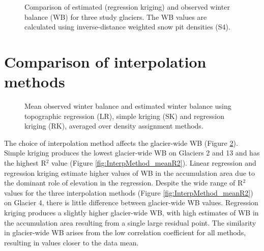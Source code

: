 \documentclass{sfuthesis}
\begin{document}
\begin{figure}
	\caption{Comparison of estimated (regression kriging) and observed winter balance (WB) for three study glaciers. The WB values are calculated using inverse-distance weighted snow pit densities (S4).}
	\label{fig:R2regressionkrig}
\end{figure}


\section{Comparison of interpolation methods}
\label{sec:compareInterpMethods}

\begin{figure}[b]
	\caption{Mean observed winter balance and estimated winter balance using topographic regression (LR), simple kriging (SK) and regression kriging (RK), averaged over density assignment methods.}
	\label{fig:InterpMethod_mean}
\end{figure}


The choice of interpolation method affects the glacier-wide WB (Figure \ref{fig:InterpMethod_mean}). Simple kriging produces the lowest glacier-wide WB on Glaciers 2 and 13 and has the highest R$^2$ value (Figure \ref{fig:InterpMethod_meanR2}). Linear regression and regression kriging estimate higher values of WB in the accumulation area due to the dominant role of elevation in the regression. Despite the wide range of R$^2$ values for the three interpolation methods (Figure \ref{fig:InterpMethod_meanR2}) on Glacier 4, there is little difference between glacier-wide WB values. Regression kriging produces a slightly higher glacier-wide WB, with high estimates of WB in the accumulation area resulting from a single large residual point. The similarity in glacier-wide WB arises from the low correlation coefficient for all methods, resulting in values closer to the data mean. 
\end{document}
